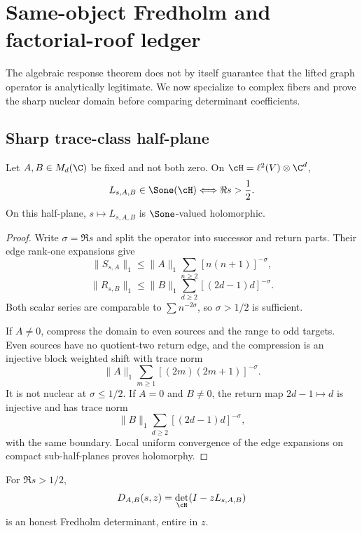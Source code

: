\section{Same-object Fredholm and factorial-roof ledger}
\label{sec:fredholm}

The algebraic response theorem does not by itself guarantee that the lifted
graph operator is analytically legitimate.  We now specialize to complex
fibers and prove the sharp nuclear domain before comparing determinant
coefficients.

\subsection{Sharp trace-class half-plane}

\begin{theorem}
\label{thm:traceclass}
Let \(A,B\in M_d(\C)\) be fixed and not both zero.  On
\(\cH=\ell^2(V)\otimes\C^d\),
\[
        L_{s,A,B}\in\Sone(\cH)
        \Longleftrightarrow
        \Re s>\frac12.
\]
On this half-plane, \(s\mapsto L_{s,A,B}\) is
\(\Sone\)-valued holomorphic.
\end{theorem}

\begin{proof}
Write \(\sigma=\Re s\) and split the operator into successor and return
parts.  Their edge rank-one expansions give
\[
 \|S_{s,A}\|_1
 \le \|A\|_1\sum_{n\ge2}[n(n+1)]^{-\sigma},
\]
\[
 \|R_{s,B}\|_1
 \le \|B\|_1\sum_{d\ge2}[(2d-1)d]^{-\sigma}.
\]
Both scalar series are comparable to \(\sum n^{-2\sigma}\), so
\(\sigma>1/2\) is sufficient.

If \(A\ne0\), compress the domain to even sources and the range to odd
targets.  Even sources have no quotient-two return edge, and the compression
is an injective block weighted shift with trace norm
\[
 \|A\|_1
 \sum_{m\ge1}[(2m)(2m+1)]^{-\sigma}.
\]
It is not nuclear at \(\sigma\le1/2\).  If \(A=0\) and \(B\ne0\), the return
map \(2d-1\mapsto d\) is injective and has trace norm
\[
 \|B\|_1
 \sum_{d\ge2}[(2d-1)d]^{-\sigma},
\]
with the same boundary.  Local uniform convergence of the edge expansions
on compact sub-half-planes proves holomorphy.
\end{proof}

\begin{corollary}
\label{cor:fredholm}
For \(\Re s>1/2\),
\[
        D_{A,B}(s,z)=\det_{\cH}(I-zL_{s,A,B})
\]
is an honest Fredholm determinant, entire in \(z\).
\end{corollary}


